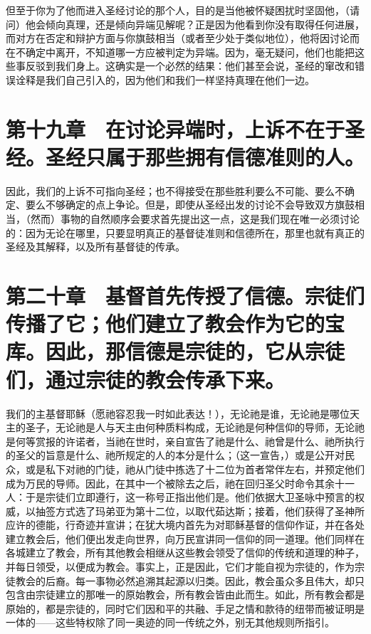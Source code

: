 但至于你为了他而进入圣经讨论的那个人，目的是当他被怀疑困扰时坚固他，（请问）他会倾向真理，还是倾向异端见解呢？正是因为他看到你没有取得任何进展，而对方在否定和辩护方面与你旗鼓相当（或者至少处于类似地位），他将因讨论而在不确定中离开，不知道哪一方应被判定为异端。因为，毫无疑问，他们也能把这些事反驳到我们身上。这确实是一个必然的结果：他们甚至会说，圣经的窜改和错误诠释是我们自己引入的，因为他们和我们一样坚持真理在他们一边。\par


\section{第十九章　在讨论异端时，上诉不在于圣经。圣经只属于那些拥有信德准则的人。}

因此，我们的上诉不可指向圣经；也不得接受在那些胜利要么不可能、要么不确定、要么不够确定的点上争论。但是，即使从圣经出发的讨论不会导致双方旗鼓相当，（然而）事物的自然顺序会要求首先提出这一点，这是我们现在唯一必须讨论的：因为无论在哪里，只要显明真正的基督徒准则和信德所在，那里也就有真正的圣经及其解释，以及所有基督徒的传承。\par


\section{第二十章　基督首先传授了信德。宗徒们传播了它；他们建立了教会作为它的宝库。因此，那信德是宗徒的，它从宗徒们，通过宗徒的教会传承下来。}

我们的主基督耶稣（愿祂容忍我一时如此表达！），无论祂是谁，无论祂是哪位天主的圣子，无论祂是人与天主由何种质料构成，无论祂是何种信仰的导师，无论祂是何等赏报的许诺者，当祂在世时，亲自宣告了祂是什么、祂曾是什么、祂所执行的圣父的旨意是什么、祂所规定的人的本分是什么；（这一宣告，）或是公开对民众，或是私下对祂的门徒，祂从门徒中拣选了十二位为首者常伴左右，并预定他们成为万民的导师。因此，在其中一个被除去之后，祂在回归圣父时命令其余十一人：于是宗徒们立即遵行，这一称号正指出他们是。他们依据大卫圣咏中预言的权威，以抽签方式选了玛弟亚为第十二位，以取代茹达斯；接着，他们获得了圣神所应许的德能，行奇迹并宣讲；在犹大境内首先为对耶稣基督的信仰作证，并在各处建立教会后，他们便出发走向世界，向万民宣讲同一信仰的同一道理。他们同样在各城建立了教会，所有其他教会相继从这些教会领受了信仰的传统和道理的种子，并每日领受，以便成为教会。事实上，正是因此，它们才能自视为宗徒的，作为宗徒教会的后裔。每一事物必然追溯其起源以归类。因此，教会虽众多且伟大，却只包含由宗徒建立的那唯一的原始教会，所有教会皆由此而生。如此，所有教会都是原始的，都是宗徒的，同时它们因和平的共融、手足之情和款待的纽带而被证明是一体的——这些特权除了同一奥迹的同一传统之外，别无其他规则所指引。\newline{}\par


